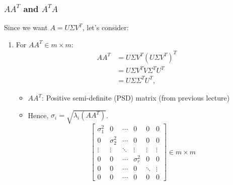 \subsubsection{$AA^T$ and $A^T A$}
\begin{derivation}
    Since we want \( A = U \Sigma V^T \), let's consider:

    \begin{enumerate}
        \item For \( A A^T \in m \times m\):
        \begin{align*}
            A A^T &= U \Sigma V^T (U \Sigma V^T)^T \\
            &= U \Sigma V^T V \Sigma^T U^T \\
            &= U \Sigma \Sigma^T U^T,
        \end{align*}
        \begin{itemize}
            \item \( A A^T \): Positive semi-definite (PSD) matrix (from previous lecture)
            \item Hence, \( \sigma_i = \sqrt{\lambda_i(A A^T)} \).
            \[
            \begin{bmatrix}
            \sigma_1^2 & 0         & \cdots & 0       & 0       & 0       \\
            0          & \sigma_2^2 & \cdots & 0       & 0       & 0       \\
            \vdots     & \vdots    & \ddots & \vdots  & \vdots  & \vdots  \\
            0          & 0         & \cdots & \sigma_r^2 & 0       & 0       \\
            0          & 0         & \cdots & 0       & \ddots  & \vdots  \\
            0          & 0         & \cdots & 0       & 0       & 0
            \end{bmatrix} \in m \times m
            \]

        \end{itemize}
    

\end{enumerate}
\end{derivation}
